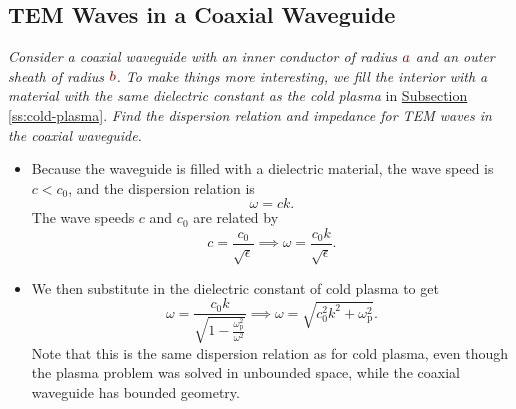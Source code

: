 \documentclass[11pt, a4paper]{article}
\newcommand{\dmath}[1]{\textcolor{Maroon}{#1}}  %
\begin{document}
\subsection{TEM Waves in a Coaxial Waveguide}
\textit{Consider a coaxial waveguide with an inner conductor of radius $ \dmath{a} $ and an outer sheath of radius $ \dmath{b} $. To make things more interesting, we fill the interior with a material with the same dielectric constant as the cold plasma} in \hyperref[ss:cold-plasma]{Subsection \ref{ss:cold-plasma}}. \textit{Find the dispersion relation and impedance for TEM waves in the coaxial waveguide.}
\begin{itemize}
	\item Because the waveguide is filled with a dielectric material, the wave speed is $ c < c_{0} $, and the dispersion relation is
	\begin{equation*}
		\omega = c k.
	\end{equation*}
    The wave speeds $ c $ and $ c_{0} $ are related by
	\begin{equation*}
		c = \frac{c_{0}}{\sqrt{\epsilon}} \implies \omega = \frac{c_{0}k}{\sqrt{\epsilon}}.
	\end{equation*}
	
	\item We then substitute in the dielectric constant of cold plasma to get
	\begin{equation*}
		\omega = \frac{c_{0}k}{\sqrt{1 - \frac{\omega_{\text{p}}^{2}}{\omega^{2}}}} \implies \omega = \sqrt{c_{0}^{2}k^{2} + \omega_{\text{p}}^{2}}.
	\end{equation*}
	Note that this is the same dispersion relation as for cold plasma, even though the plasma problem was solved in unbounded space, while the coaxial waveguide has bounded geometry.
\end{itemize}
\end{document}
